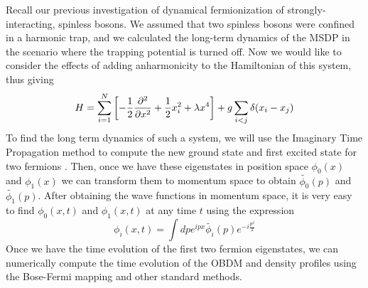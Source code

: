 \documentclass[onecolumn,english,aps,pra]{revtex4}
\begin{document}
Recall our previous investigation of dynamical fermionization of strongly-interacting, spinless bosons. We assumed that two spinless bosons were confined in a harmonic trap, and we calculated the long-term dynamics of the MSDP in the scenario where the trapping potential is turned off. Now we would like to consider the effects of adding anharmonicity to the Hamiltonian of this system, thus giving 
\begin{equation}
    H = \sum_{i = 1}^{N} \left[ -\frac{1}{2} \pdv[2]{}{x} + \frac{1}{2} x_i^2 + \lambda x^4 \right]
            + g \sum_{i < j} \delta(x_i - x_j)
\end{equation}
To find the long term dynamics of such a system, we will use the Imaginary Time Propagation method to compute the new ground state and first excited state for two fermions \cite{chiofalo2000ground, muruganandam2009fortran}. Then, once we have these eigenstates in position space $\phi_0(x)$ and $\phi_1(x)$ we can transform them to momentum space to obtain $\widetilde{\phi_0}(p)$ and $\widetilde{\phi_1}(p)$. After obtaining the wave functions in momentum space, it is very easy to find $\phi_0(x,t)$ and $\phi_1(x,t)$ at any time $t$ using the expression
\begin{equation}
\phi_i(x,t) = \int dp e^{ipx} \widetilde{\phi_i}(p) e^{-i\frac{p^2}{2}}
\end{equation}
Once we have the time evolution of the first two fermion eigenstates, we can numerically compute the time evolution of the OBDM and density profiles using the Bose-Fermi mapping and other standard methods.



\pagebreak


\end{document}
